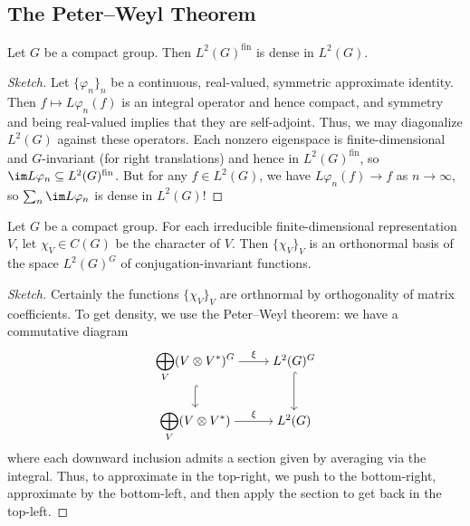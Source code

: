 \documentclass{article}
\begin{document}
\subsection{The Peter--Weyl Theorem}
\begin{theorem}
	Let $G$ be a compact group. Then $L^2(G)^{\mathrm{fin}}$ is dense in $L^2(G)$.
\end{theorem}
\begin{proof}[Sketch]
	Let $\{\varphi_n\}_n$ be a continuous, real-valued, symmetric approximate identity. Then $f\mapsto L\varphi_n(f)$ is an integral operator and hence compact, and symmetry and being real-valued implies that they are self-adjoint. Thus, we may diagonalize $L^2(G)$ against these operators. Each nonzero eigenspace is finite-dimensional and $G$-invariant (for right translations) and hence in $L^2(G)^{\mathrm{fin}}$, so $\im L\varphi_n\subseteq L^2(G)^{\mathrm{fin}}$. But for any $f\in L^2(G)$, we have $L\varphi_n(f)\to f$ as $n\to\infty$, so $\sum_n\im L\varphi_n$ is dense in $L^2(G)$!
\end{proof}
\begin{corollary}
	Let $G$ be a compact group. For each irreducible finite-dimensional representation $V$, let $\chi_V\in C(G)$ be the character of $V$. Then $\{\chi_V\}_V$ is an orthonormal basis of the space $L^2(G)^G$ of con\-jugation-invariant functions.
\end{corollary}
\begin{proof}[Sketch]
	Certainly the functions $\{\chi_V\}_V$ are orthnormal by orthogonality of matrix coefficients. To get density, we use the Peter--Weyl theorem: we have a commutative diagram
	\[\begin{tikzcd}[cramped]
		{\displaystyle\bigoplus_V(V\otimes V^*)^G} & {L^2(G)^G} \\
		{\displaystyle\bigoplus_V(V\otimes V^*)} & {L^2(G)}
		\arrow["\xi", from=1-1, to=1-2]
		\arrow[hook, from=1-1, to=2-1]
		\arrow[hook, from=1-2, to=2-2]
		\arrow["\xi", from=2-1, to=2-2]
	\end{tikzcd}\]
	where each downward inclusion admits a section given by averaging via the integral. Thus, to approximate in the top-right, we push to the bottom-right, approximate by the bottom-left, and then apply the section to get back in the top-left.
\end{proof}
\end{document}
